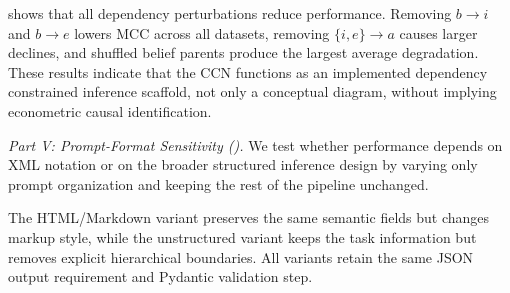 \documentclass[a4paper,fleqn,doubleblind]{cas-sc}
\begin{document}
{{ shows that all dependency perturbations reduce performance. Removing $b\rightarrow i$ and $b\rightarrow e$ lowers MCC across all datasets, removing $\{i,e\}\rightarrow a$ causes larger declines, and shuffled belief parents produce the largest average degradation. These results indicate that the CCN functions as an implemented dependency constrained inference scaffold, not only a conceptual diagram, without implying econometric causal identification.
}

\textit{Part V: Prompt-Format Sensitivity ().} We test whether performance depends on XML notation or on the broader structured inference design by varying only prompt organization and keeping the rest of the pipeline unchanged.

The HTML/Markdown variant preserves the same semantic fields but changes markup style, while the unstructured variant keeps the task information but removes explicit hierarchical boundaries. All variants retain the same JSON output requirement and Pydantic validation step.

\begin{table}[htbp]
\centering
\small
\renewcommand{\arraystretch}{0.85}
\caption{Prompt-format sensitivity diagnostic using the Qwen2.5-72B backbone. Values are reported as mean $\pm$ standard deviation over five runs; $\Delta$MCC is computed relative to the XML structured prompt on the same dataset.}
\label{tab:prompt_format_sensitivity}
\end{table}

}
\end{document}
